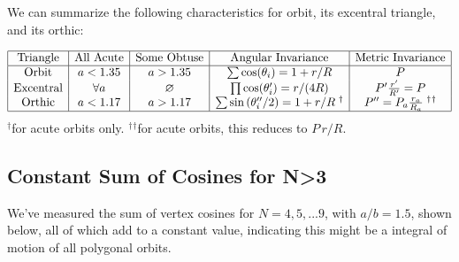 \documentclass[]{article}
\begin{document}
We can summarize the following characteristics for orbit, its excentral triangle, and its orthic:

\[
\begin{array}{|c|c|c|c|c|}
\hline
\bf{\text{Triangle}} & \bf{\text{All Acute}} & \bf{\text{Some Obtuse}} & \bf{\text{Angular Invariance}} & \bf{\text{Metric Invariance}} \\
\hline
\text{Orbit} & a<1.35 & a>1.35 & \sum{\cos(\theta_i)} = 1+r/R & P \\
\text{Excentral} & \forall a & \varnothing  & \prod{\cos(\theta_i')}=r/(4R) & P'\frac{r'}{R'} = P  \\
\text{Orthic} & a<1.17 & a>1.17 & \sum{\sin{(\theta_i''/2)}}=1+r/R\;^\dagger &  P'' = P_a\frac{r_a}{R_a}\;{^\dagger}{^\dagger} \\
\hline
\end{array}
\]
\(^\dagger\)for acute orbits only.
\({^\dagger}{^\dagger}\)for acute orbits, this reduces to \(P\,r/R\).

\hypertarget{constant-sum-of-cosines-for-n3}{%
\subsection{Constant Sum of Cosines for N\textgreater{}3}\label{constant-sum-of-cosines-for-n3}}

We've measured the sum of vertex cosines for \(N=4,5,...9\), with \(a/b=1.5\), shown below, all of which add to a constant value, indicating this might be a integral of motion of all polygonal orbits.
\end{document}
